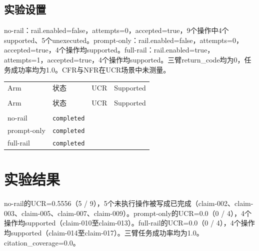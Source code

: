 \documentclass[UTF8]{ctexart}
\begin{document}
\subsection{实验设置}
no-\allowbreak{}rail：rail.enabled=false，attempts=0，accepted=true，9个操作中4个supported、5个unexecuted。prompt-\allowbreak{}only：rail.enabled=false，attempts=0，accepted=true，4个操作均supported。full-\allowbreak{}rail：rail.enabled=true，attempts=1，accepted=true，4个操作均supported。三臂return\_\allowbreak{}code均为0，任务成功率均为1.0。CFR与NFR在UCR场景中未测量。
\begin{longtable}{@{}>{\raggedright\arraybackslash}p{}>{\raggedright\arraybackslash}p{}>{\raggedleft\arraybackslash}p{}>{\raggedleft\arraybackslash}p{}@{}}
\toprule
Arm & 状态 & UCR & Supported\\\\
\midrule
\endfirsthead
\toprule
Arm & 状态 & UCR & Supported\\\\
\midrule
\endhead
no-\allowbreak{}rail & \texttt{\scriptsize completed} & 0.5556 & 4 \\
prompt-\allowbreak{}only & \texttt{\scriptsize completed} & 0.0 & 4 \\
full-\allowbreak{}rail & \texttt{\scriptsize completed} & 0.0 & 4 \\
\bottomrule
\end{longtable}
\section{实验结果}
no-\allowbreak{}rail的UCR=0.5556（5 / 9），5个未执行操作被写成已完成（claim-\allowbreak{}002、claim-\allowbreak{}003、claim-\allowbreak{}005、claim-\allowbreak{}007、claim-\allowbreak{}009）。prompt-\allowbreak{}only的UCR=0.0（0 / 4），4个操作均supported（claim-\allowbreak{}010至claim-\allowbreak{}013）。full-\allowbreak{}rail的UCR=0.0（0 / 4），4个操作均supported（claim-\allowbreak{}014至claim-\allowbreak{}017）。三臂任务成功率均为1.0。citation\_\allowbreak{}coverage=0.0。
\end{document}
